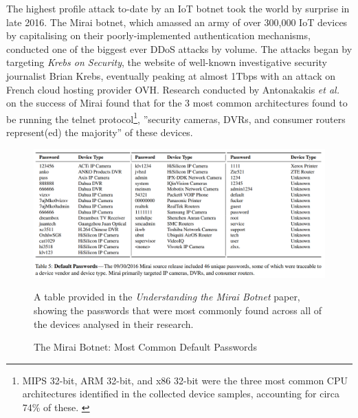 The highest profile attack to-date by an IoT botnet took the world by surprise in late 2016. The Mirai botnet, which amassed an army of over 300,000 IoT devices by capitalising on their poorly-implemented authentication mechanisms, conducted one of the biggest ever DDoS attacks by volume. The attacks began by targeting \textit{Krebs on Security}, \cite{KrebsOnSecurity} the website of well-known investigative security journalist Brian Krebs, eventually peaking at almost 1Tbps with an attack on French cloud hosting provider OVH. Research conducted by Antonakakis \textit{et al.} \cite{UnderstandingTheMiraiBotnet} on the success of Mirai found that for the 3 most common architectures found to be running the telnet protocol\footnote{MIPS 32-bit, ARM 32-bit, and x86 32-bit were the three most common CPU architectures identified in the collected device samples, accounting for circa 74\% of these. \cite{UnderstandingTheMiraiBotnet}}, ''security cameras, DVRs, and consumer routers represent(ed) the majority'' of these devices.


\begin{figure}[ht]
      \centering
      \includegraphics[width=175mm, scale=1]{Images/Understanding_the_Mirai_Botnet_-_table_of_default_passwords.png}
      \caption{The Mirai Botnet: Most Common Default Passwords}
      \medskip
	  \small
		A table provided in the \textit{Understanding the Mirai Botnet} paper, \cite{UnderstandingTheMiraiBotnet} showing the passwords that were most commonly found across all of the devices analysed in their research. 
\label{fig:UnderstandingTheMiraiBotnet_DefaultPasswordsTable}
\end{figure}

